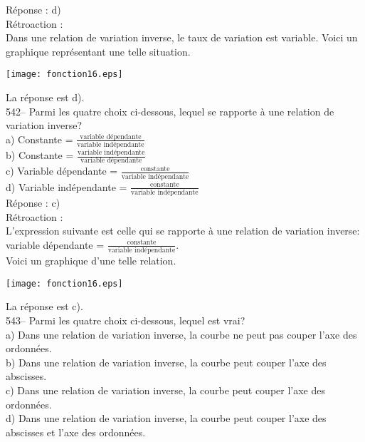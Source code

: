 ﻿\documentclass[letterpaper, 12pt]{article}
\begin{document}
R\'eponse : d)\\

R\'etroaction : \\
Dans une relation de variation inverse, le taux de variation est variable.
Voici un graphique repr\'esentant une telle situation.\\
    \begin{center}
    \texttt{[image: fonction16.eps]}
    \end{center}

La r\'eponse est d).\\


542-- Parmi les quatre choix ci-dessous, lequel se rapporte \`a une relation
de variation inverse?\\[2mm]
a) Constante = $\frac{\textrm{variable d\'ependante}}{\textrm{variable
ind\'ependante}}$\\[2mm]
b) Constante = $\frac{\textrm{variable ind\'ependante}}{\textrm{variable
d\'ependante}}$\\[2mm]
c) Variable d\'ependante = $\frac{\textrm{constante}}{\textrm{variable
ind\'ependante}}$\\[2mm]
d) Variable ind\'ependante = $\frac{\textrm{constante}}{\textrm{variable
ind\'ependante}}$\\

R\'eponse : c)\\

R\'etroaction : \\
L'expression suivante est celle qui se rapporte \`a une relation de
variation inverse:\\[2mm]
variable d\'ependante = $\frac{\textrm{constante}}{\textrm{variable
ind\'ependante}}$.\\[2mm]
Voici un graphique d'une telle relation.
    \begin{center}
    \texttt{[image: fonction16.eps]}
    \end{center}
La r\'eponse est c).\\

543-- Parmi les quatre choix ci-dessous, lequel est vrai?\\
a) Dans une relation de variation inverse, la courbe ne peut pas couper
l'axe des ordonn\'ees.\\
b) Dans une relation de variation inverse, la courbe peut couper l'axe des
abscisses.\\
c) Dans une relation de variation inverse, la courbe peut couper l'axe des
ordonn\'ees.\\
d) Dans une relation de variation inverse, la courbe peut couper l'axe des
abscisses et l'axe des ordonn\'ees.\\
\end{document}
